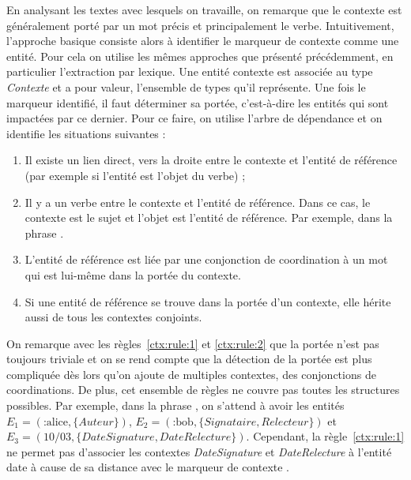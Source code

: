 En analysant les textes avec lesquels on travaille, on remarque que le contexte est généralement porté par un mot précis et principalement le verbe.
Intuitivement, l'approche basique consiste alors à identifier le marqueur de contexte comme une entité.
Pour cela on utilise les mêmes approches que présenté précédemment, en particulier l'extraction par lexique.
Une entité contexte est associée au type \emph{Contexte} et a pour valeur, l'ensemble de types qu'il représente.
Une fois le marqueur identifié, il faut déterminer sa portée, c'est-à-dire les entités qui sont impactées par ce dernier.
Pour ce faire, on utilise l'arbre de dépendance et on identifie les situations suivantes :
\begin{enumerate}
    \item Il existe un lien direct, vers la droite entre le contexte et l'entité de référence (par exemple si l'entité est l'objet du verbe) ;

    \item Il y a un verbe entre le contexte et l'entité de référence.
          Dans ce cas, le contexte est le sujet et l'objet est l'entité de référence.
          Par exemple, dans la phrase .

    \item L'entité de référence est liée par une conjonction de coordination à un mot qui est lui-même dans la portée du contexte. \label{ctx:rule:1}

    \item Si une entité de référence se trouve dans la portée d'un contexte, elle hérite aussi de tous les contextes conjoints. \label{ctx:rule:2}
\end{enumerate}

On remarque avec les règles~\ref{ctx:rule:1} et \ref{ctx:rule:2} que la portée n'est pas toujours triviale et on se rend compte que la détection de la portée est plus compliquée dès lors qu'on ajoute de multiples contextes, des conjonctions de coordinations.
De plus, cet ensemble de règles ne couvre pas toutes les structures possibles.
Par exemple, dans la phrase , on s'attend à avoir les entités $E_1 = (\text{:alice}, \{Auteur\})$, $E_2 = (\text{:bob}, \{Signataire, Relecteur\})$ et $E_3 = (10/03, \{DateSignature, DateRelecture\})$.
Cependant, la règle~\ref{ctx:rule:1} ne permet pas d'associer les contextes \emph{DateSignature} et \emph{DateRelecture} à l'entité date à cause de sa distance avec le marqueur de contexte .

